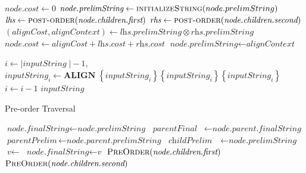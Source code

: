 \documentclass{bmcart}
\begin{document}
\begin{backmatter}
\begin{algorithm}
\begin{algorithmic}[1]
			\State $\textit{node.cost} \gets 0$
			\State $\textit{node.prelimString} \gets \Call{initializeString}{node.prelimString}$
			\Else
			\State $\textit{lhs}  \gets \Call{post-order}{\textit{node.children.first}}$
			\State $\textit{rhs}  \gets \Call{post-order}{\textit{node.children.second}}$
			\State $\left(\textit{alignCost}, \textit{alignContext}\right) \gets \textit{lhs.prelimString} \otimes \textit{rhs.prelimString}$ 
			\State $\textit{node.cost} \gets \textit{alignCost} + \textit{lhs.cost} + \textit{rhs.cost}$
			\State $\textit{node.prelimString} \gets \textit{alignContext}$
			\EndIf
			\EndFunction

			\Ensure{$\Sigma_{\Gamma}^{*}$ }
			\State $i \gets \vert\textit{inputString} \;\vert - 1,$
			\State $\textit{inputString}_i \gets \textbf{ALIGN} \; \left\{ \textit{inputString}_i\right\} \left\{ \textit{inputString}_i \right\} \left\{ \textit{inputString}_i \right\}$
			\State $i \gets i - 1$
			\EndWhile
			\Return $\textit{inputString}$
			\EndFunction
			
		\end{algorithmic}
	\end{algorithm}

    \begin{algorithm}
		\caption{Pre-order Traversal}
		\label{Alg:preorder}
		\begin{algorithmic}[1]
			 
			\State $\textit{node.finalString} \gets \textit{node.prelimString}$
			\Else  {}
			\State $\textit{parentFinal} \;\;\; \gets \textit{node.parent.finalString}$
			\State $\textit{parentPrelim}    \, \gets \textit{node.parent.prelimString}$
			\State $\textit{childPrelim} \;\;\;\, \gets \textit{node.prelimString}$
			\State $\textit{v} \gets$ 
			\State $\textit{node.finalString} \gets \textit{v}$
			\EndIf
			\State $\Call{PreOrder}{\textit{node.children.first}}$
			\State $\Call{PreOrder}{\textit{node.children.second}}$
			\EndFunction
			

\end{algorithmic}
\end{algorithm}
\end{backmatter}
\end{document}
